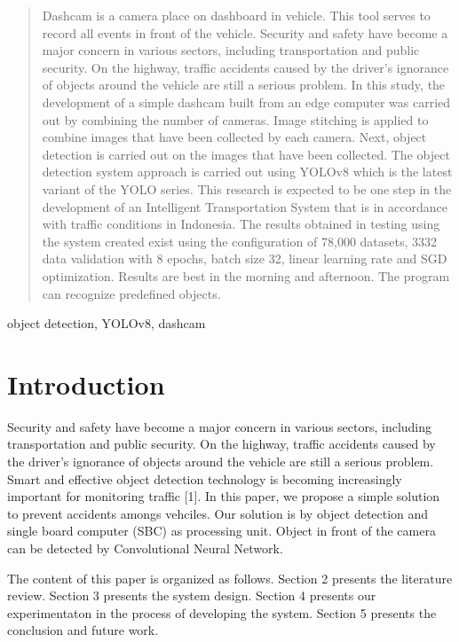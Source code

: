 \documentclass[conference]{IEEEtran}
\begin{document}
\begin{abstract}
Dashcam is a camera place on dashboard  in vehicle. This tool serves to record all events in front of the vehicle. 
Security and safety have become a major concern in various sectors, including transportation and public security. 
On the highway, traffic accidents caused by the driver's ignorance of objects around the vehicle are still a serious problem. 
In this study, the development of a simple dashcam built from an edge computer was carried out by combining the number of cameras. Image stitching is applied to combine images that have been collected by each camera.  
Next, object detection is carried out on the images that have been collected. The object detection system approach is carried out using YOLOv8 which is the latest variant of the YOLO series. This research is expected to be one step in the development of an Intelligent Transportation System that is in accordance with traffic conditions in Indonesia.
The results obtained in testing using the system created exist using the configuration of 78,000 datasets, 3332 data validation with 8 epochs, batch size 32, linear learning rate and SGD optimization. Results are best in the morning and afternoon. The program can recognize predefined objects. 
\end{abstract}

\begin{IEEEkeywords}
object detection, YOLOv8, dashcam
\end{IEEEkeywords}

\section{Introduction}
Security and safety have become a major concern in various sectors, including transportation and public security. On the highway, traffic accidents caused by the driver's ignorance of objects around the vehicle are still a serious problem. 
Smart and effective object detection technology is becoming increasingly important for monitoring traffic [1].
In this paper, we propose a simple solution to prevent accidents amongs vehciles. Our solution is by object detection and single board computer (SBC) as processing unit. Object in front of the camera can be detected by Convolutional Neural Network. 

The content of this paper is organized as follows. Section 2 presents the literature review. Section 3 presents the system design. Section 4 presents our experimentaton in the process of developing the system. Section 5 presents the conclusion and future work.
\end{document}

